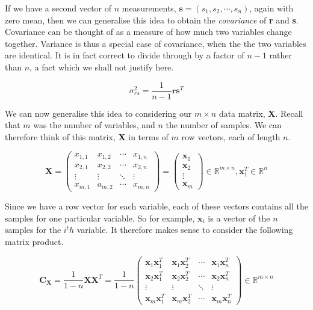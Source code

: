 \documentclass[12pt]{article}
\theoremstyle{plain}
\begin{document}
If we have a second vector of $n$ measurements, $\textbf{s} = (s_1, s_2, \cdots , s_n)$, again with zero mean, then we can generalise this idea to obtain the \emph{covariance} of \textbf{r} and \textbf{s}. Covariance can be thought of as a measure of how much two variables change together. Variance is thus a special case of covariance, when the the two variables are identical. It is in fact correct to divide through by a factor of $n-1$ rather than $n$, a fact which we shall not justify here.

\begin{equation}
\sigma_{rs}^2=\frac{1}{n-1}\textbf{rs}^T
\end{equation}

We can now generalise this idea to considering our $m \times n$ data matrix, \textbf{X}. Recall that $m$ was the number of variables, and $n$ the number of samples. We can therefore think of this matrix, \textbf{X} in terms of $m$ row vectors, each of length $n$.

\begin{equation}
\textbf{X} = 
 \begin{pmatrix}
  x_{1,1} &x_{1,2} & \cdots & x_{1,n} \\
  x_{2,1} & x_{2,2} & \cdots &x_{2,n} \\
  \vdots  & \vdots  & \ddots & \vdots  \\
  x_{m,1} & a_{m,2} & \cdots & x_{m,n} 
 \end{pmatrix} =
\begin{pmatrix}
   \textbf{x}_1 \\
  \textbf{x}_2 \\
  \vdots   \\
 \textbf{x}_m 
 \end{pmatrix} \in \mathbb{R}^{m\times n}, \textbf{x}_1^T \in \mathbb{R}^n
\end{equation}

Since we have a row vector for each variable, each of these vectors contains all the samples
for one particular variable. So for example,  $\textbf{x}_i$ is a vector of the $n$ samples for the $i^th$ variable. It therefore makes sense to consider the following matrix product.

\begin{equation}
\textbf{C}_{\textbf{X}}= \frac{1}{1-n}\textbf{XX}^T=\frac{1}{1-n}
 \begin{pmatrix}
 \textbf{x}_1\textbf{x}_1^T  & \textbf{x}_1\textbf{x}_2^T & \cdots & \textbf{x}_1\textbf{x}_n^T \\
 \textbf{x}_2\textbf{x}_1^T  & \textbf{x}_2\textbf{x}_2^T & \cdots & \textbf{x}_2\textbf{x}_n^T \\
  \vdots  & \vdots  & \ddots & \vdots  \\
\textbf{x}_m\textbf{x}_1^T  & \textbf{x}_m\textbf{x}_2^T & \cdots & \textbf{x}_m\textbf{x}_n^T
 \end{pmatrix} \in \mathbb{R}^{m\times n}
\end{equation}
\end{document}
